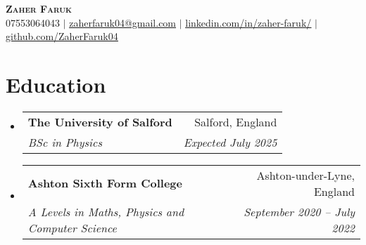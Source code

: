 \documentclass[letterpaper,11pt]{article}
\makeatletter
\newcommand{\resumeSubheading}[4]{
  \vspace{-2pt}\item
    \begin{tabular*}{0.97\textwidth}[t]{l@{\extracolsep{\fill}}r}
      \textbf{#1} & #2 \\
      \textit{\small#3} & \textit{\small #4} \\
    \end{tabular*}\vspace{-7pt}
}
\newcommand{\resumeSubHeadingListStart}{\begin{itemize}[leftmargin=0.15in, label={}]}
\newcommand{\resumeSubHeadingListEnd}{\end{itemize}}
\makeatother
\begin{document}
\begin{center}
    \textbf{\Huge \scshape Zaher Faruk} \\ \vspace{1pt}
    \small 07553064043 $|$ \href{mailto:zaherfaruk@gmail.com}{\underline{zaherfaruk04@gmail.com}} $|$ 
    \href{https://www.linkedin.com/in/zaher-faruk/}{\underline{linkedin.com/in/zaher-faruk/}} $|$
    \href{https://github.com/ZaherFaruk04}{\underline{github.com/ZaherFaruk04}}
\end{center}

\section{Education}
  \resumeSubHeadingListStart
    \resumeSubheading
      {The University of Salford}{Salford, England}
      {BSc in Physics}{Expected July 2025}
    \resumeSubheading
      {Ashton Sixth Form College}{Ashton-under-Lyne, England }
      {A Levels in Maths, Physics and Computer Science}{September 2020 -- July 2022}
  \resumeSubHeadingListEnd
  
\end{document}
